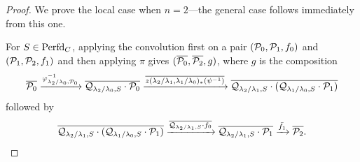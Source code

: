 \begin{proof}
    We prove the local case when $n=2$---the general case follows immediately from this one. 

   For $S \in \mathrm{Perfd}_{C}$, applying the convolution first on a pair  $(\mathcal{P}_{0}, \mathcal{P}_{1}, f_{0})$ and $(\mathcal{P}_{1}, \mathcal{P}_{2}, f_{1})$ and then applying $\pi$ gives $(\overline{\mathcal{P}_{0}}, \overline{\mathcal{P}_{2}}, g)$, where $g$ is the composition 
\begin{equation*}
\overline{\mathcal{P}_{0}} \xrightarrow{\varphi_{\lambda_{2}/\lambda_{0},\mathcal{P}_{0}}^{-1}} \overline{\mathcal{Q}_{\lambda_{2}/\lambda_{0},S} \cdot \mathcal{P}_{0}} \xrightarrow{\overline{z(\lambda_{2}/\lambda_{1},\lambda_{1}/\lambda_{0})_{*}(\psi^{-1})}}  \overline{\mathcal{Q}_{\lambda_{2}/\lambda_{1},S}\cdot(\mathcal{Q}_{\lambda_{1}/\lambda_{0},S}  \cdot \mathcal{P}_{1})} 
\end{equation*}
followed by 
\begin{equation*}
\overline{\mathcal{Q}_{\lambda_{2}/\lambda_{1},S}\cdot(\mathcal{Q}_{\lambda_{1}/\lambda_{0},S}  \cdot \mathcal{P}_{1})}  \xrightarrow{\overline{\mathcal{Q}_{\lambda_{2}/\lambda_{1},S} \cdot f_{0}}} \overline{\mathcal{Q}_{\lambda_{2}/\lambda_{1},S} \cdot \mathcal{P}_{1}} \xrightarrow{\bar{f_{1}}} \overline{\mathcal{P}_{2}}.
\end{equation*}


\end{proof}
